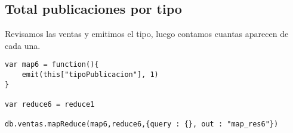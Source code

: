 \subsection{Total publicaciones por tipo}

Revisamos las ventas y emitimos el tipo, luego contamos cuantas aparecen de cada una.

\begin{verbatim}
var map6 = function(){
    emit(this["tipoPublicacion"], 1)		
}

var reduce6 = reduce1

db.ventas.mapReduce(map6,reduce6,{query : {}, out : "map_res6"})
\end{verbatim}
